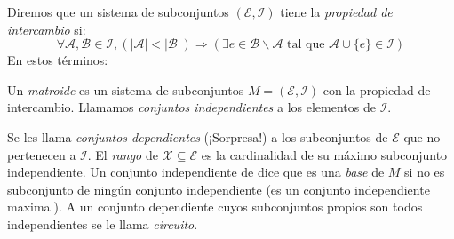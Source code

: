   Diremos que un sistema de subconjuntos \((\mathscr{E}, \mathscr{I})\)
  tiene la \emph{propiedad de intercambio}
  si:
  \begin{equation}
    \label{eq:subset-system-exchange}
    \forall \mathscr{A}, \mathscr{B} \in \mathscr{I},
      (\lvert \mathscr{A} \rvert < \lvert\mathscr{B} \rvert)
        \Longrightarrow
          (\exists e \in \mathscr{B} \smallsetminus \mathscr{A}
             \text{\ tal que\ } \mathscr{A} \cup \{ e \} \in \mathscr{I})
  \end{equation}
  En estos términos:
  \begin{definition}
    Un \emph{matroide} es un sistema de subconjuntos
    \(M = (\mathscr{E}, \mathscr{I})\)
    con la propiedad de intercambio.
    Llamamos \emph{conjuntos independientes}
    a los elementos de \(\mathscr{I}\).
  \end{definition}
  Se les llama \emph{conjuntos dependientes}
  (¡Sorpresa!)
  a los subconjuntos de \(\mathscr{E}\) que no pertenecen a \(\mathscr{I}\).
  El \emph{rango} de \(\mathscr{X} \subseteq \mathscr{E}\)
  es la cardinalidad de su máximo subconjunto independiente.
  Un conjunto independiente de dice que es una \emph{base} de \(M\)
  si no es subconjunto de ningún conjunto independiente
  (es un conjunto independiente maximal).
  A un conjunto dependiente cuyos subconjuntos propios
  son todos independientes se le llama \emph{circuito}.

